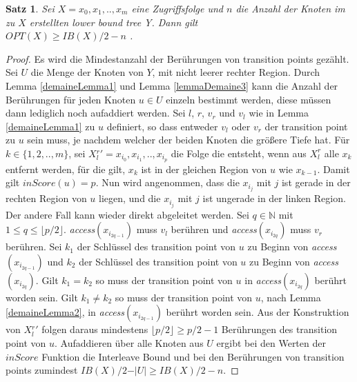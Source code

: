 \documentclass[a4paper,12pt]{article}
\newtheorem{Satz}{Satz}[section]
\begin{document}
\begin{Satz} \label{satzDemaine1}
	Sei $X = x_0, x_1,.., x_m$  eine Zugriffsfolge und $n$ die Anzahl der Knoten im zu $X$ erstellten lower bound tree Y. Dann gilt\\	
	$\mathit{OPT}\left(X\right) \geq \mathit{IB}\left(X\right) /2 - n$ .
\end{Satz}
\begin{proof}
	Es wird die Mindestanzahl der Berührungen von transition points gezählt. Sei $U$ die Menge der Knoten von $Y$, mit nicht leerer rechter Region. Durch Lemma \ref{demaineLemma1} und Lemma \ref{lemmaDemaine3} kann die Anzahl der Berührungen für jeden Knoten $u \in U$ einzeln bestimmt werden, diese müssen dann lediglich noch aufaddiert werden. Sei $l$, $r$, $v_r$ und $v_l$ wie in Lemma \ref{demaineLemma1} zu $u$ definiert, so dass entweder $v_l$ oder $v_r$ der transition point zu $u$ sein muss, je nachdem welcher der beiden Knoten die größere Tiefe hat. Für $k \in \{1, 2,.., m\}$, sei $X{^r_l}' = x_{i_0},x_{i_1},..,x_{i_p}$ die Folge die entsteht, wenn aus $X^r_l$ alle $x_k$ entfernt werden, für die gilt, $x_k$ ist in der gleichen Region von $u$ wie $x_{k-1}$. Damit gilt $\mathit{inScore}\left(u\right) = p$. Nun wird angenommen, dass die $x_{i_j}$ mit $j$ ist gerade in der rechten Region von $u$ liegen, und die $x_{i_j}$ mit $j$ ist ungerade in der linken Region. Der andere Fall kann wieder direkt abgeleitet werden. Sei $q \in \mathbb{N}$ mit $1 \leq q \leq \lfloor p / 2 \rfloor$. \textit{access}$\left( x_{i_{2q-1}} \right)$ muss $v_l$ berühren und \textit{access}$\left( x_{i_{2q}} \right)$ muss $v_r$ berühren. Sei $k_{1}$ der Schlüssel des transition point von $u$ zu Beginn von \textit{access}$\left( x_{i_{2q-1}} \right)$ und  $k_{2}$ der Schlüssel des transition point von $u$ zu Beginn von \textit{access}$\left( x_{i_{2q}} \right)$. Gilt $k_{1} = k_{2}$ so muss der transition point von $u$ in \textit{access}$\left( x_{i_{2q}} \right)$ berührt worden sein.  Gilt $k_{1} \ne k_{2}$ so muss der transition point von $u$, nach Lemma \ref{demaineLemma2}, in \textit{access}$\left( x_{i_{2q-1}} \right)$ berührt worden sein. Aus der Konstruktion von $X{^r_l}'$ folgen daraus mindestens $\lfloor p/2 \rfloor \geq p/2 - 1$ Berührungen des transition point von $u$. Aufaddieren über alle Knoten aus $U$ ergibt bei den Werten der $\mathit{inScore}$ Funktion die Interleave Bound und bei den Berührungen von transition points zumindest  $\mathit{IB}\left(X\right) /2 - \vert U \vert \geq \mathit{IB}\left(X\right) /2 - n$.
	
\end{proof}
\end{document}
